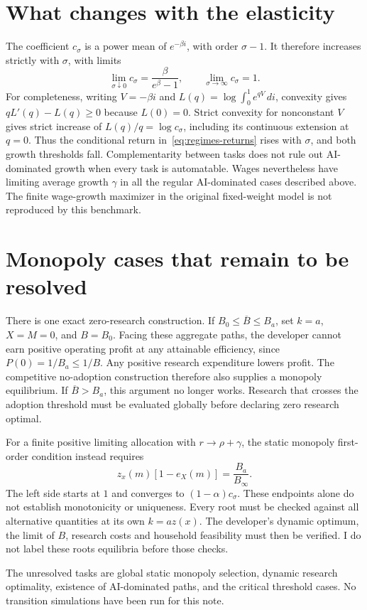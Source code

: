 \documentclass[11pt]{article}
\begin{document}
\section{What changes with the elasticity}
The coefficient $c_\sigma$ is a power mean of $e^{-\beta i}$, with order
$\sigma-1$. It therefore increases strictly with $\sigma$, with limits
\[
 \lim_{\sigma\downarrow0}c_\sigma=\frac{\beta}{e^\beta-1},\qquad
 \lim_{\sigma\to\infty}c_\sigma=1.
\]
For completeness, writing $V=-\beta i$ and
$L(q)=\log\int_0^1e^{qV}\,di$, convexity gives
$qL'(q)-L(q)\geq0$ because $L(0)=0$. Strict convexity for nonconstant $V$
gives strict increase of $L(q)/q=\log c_\sigma$, including its continuous
extension at $q=0$.
Thus the conditional return in~\eqref{eq:regimes-returns} rises with
$\sigma$, and both growth thresholds fall. Complementarity between tasks
does not rule out AI-dominated growth when every task is automatable.
Wages nevertheless have limiting average growth $\gamma$ in all the
regular AI-dominated cases described above. The finite wage-growth maximizer
in the original fixed-weight model is not reproduced by this benchmark.

\section{Monopoly cases that remain to be resolved}
There is one exact zero-research construction. If $B_0\leq\overline B\leq B_a$,
set $k=a$, $X=M=0$, and $B=B_0$. Facing these aggregate paths, the developer
cannot earn positive operating profit at any attainable efficiency, since
$P(0)=1/B_a\leq1/B$. Any positive research expenditure lowers profit.
The competitive no-adoption construction therefore also supplies a monopoly
equilibrium. If $\overline B>B_a$, this argument no longer works. Research
that crosses the adoption threshold must be evaluated globally before declaring
zero research optimal.

For a finite positive limiting allocation with $r\to\rho+\gamma$, the
static monopoly first-order condition instead requires
\begin{equation}
 z_x(m)[1-e_X(m)]=\frac{B_a}{B_\infty}.
 \label{eq:regimes-mon-finite}
\end{equation}
The left side starts at $1$ and converges to $(1-\alpha)c_\sigma$.
These endpoints alone do not establish monotonicity or uniqueness.
Every root must be checked against all alternative quantities at its own
$k=a z(x)$. The developer's dynamic optimum, the limit of $B$, research costs
and household feasibility must then be verified. I do not label these roots
equilibria before those checks.

The unresolved tasks are global static monopoly selection, dynamic research
optimality, existence of AI-dominated paths, and the critical threshold cases.
No transition simulations have been run for this note.
\end{document}
